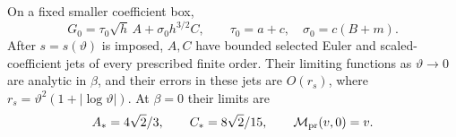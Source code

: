 \begin{lemma}
\label{rw:source:center-division}
On a fixed smaller coefficient box,
\begin{equation}\label{rw:source:unforced-division}
 G_0=\tau_0\sqrt h\,A+\sigma_0h^{3/2}C,
 \qquad \tau_0=a+c,\quad\sigma_0=c(B+m).
\end{equation}
After $s=s(\vartheta)$ is imposed, $A,C$ have bounded selected
Euler and scaled-coefficient jets of every prescribed finite order.
Their limiting functions as $\vartheta\to0$ are analytic in $\beta$,
and their errors in these jets are
$O(r_s)$, where $r_s=\vartheta^2(1+|\log\vartheta|)$.
At $\beta=0$ their limits are
\begin{equation}\label{rw:source:moments}
 A_*={4\sqrt2}/{3},\qquad C_*={8\sqrt2}/{15},\qquad
 \mathcal M_{\rm pr}(v,0)=v.
\end{equation}
\end{lemma}
